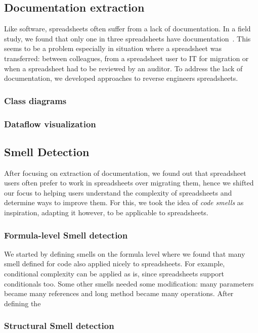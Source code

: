 \documentclass[conference]{IEEEtran}
\begin{document}
\subsection{Documentation extraction} 
Like software, spreadsheets often suffer from a lack of documentation. In a field study, we found that only one in three spreadsheets have documentation~\cite{Hermans2011}. This seems to be a problem especially in situation where a spreadsheet was transferred: between colleagues, from a spreadsheet user to IT for migration or when a spreadsheet had to be reviewed by an auditor. To address the lack of documentation, we developed approaches to reverse engineers spreadsheets.

\subsubsection{Class diagrams}

\subsubsection{Dataflow visualization}

\subsection{Smell Detection} 
After focusing on extraction of documentation, we found out that spreadsheet users often prefer to work in spreadsheets over migrating them, hence we shifted our focus to helping users understand the complexity of spreadsheets and determine ways to improve them. For this, we took the idea of \emph{code smells} as inspiration, adapting it however, to be applicable to spreadsheets.

\subsubsection{Formula-level Smell detection}
We started by defining smells on the formula level where we found that many smell defined for code also applied nicely to spreadsheets. For example, conditional complexity can be applied as is, since spreadsheets support conditionals too. Some other smells needed some modification: many parameters became many references and long method became many operations. After defining the 

\subsubsection{Structural Smell detection}
\end{document}
